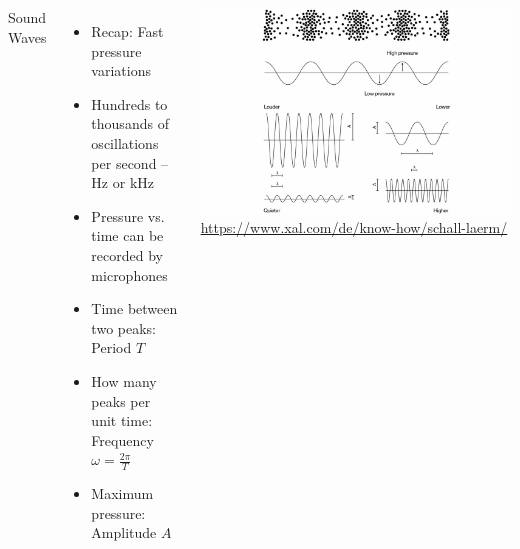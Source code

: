 \begin{frame}
%
\begin{columns}[T]
\begin{Large}
	{Sound Waves}
	\vspace{6pt}
\end{Large}
%
\begin{itemize}
\item Recap: Fast pressure variations 
\item Hundreds to thousands of oscillations per second -- Hz or kHz
\item Pressure vs. time can be recorded by microphones
\item Time between two peaks: Period $T$
\item How many peaks per unit time: Frequency $\omega = \frac{2\pi}{T}$
\item Maximum pressure: Amplitude $A$
\end{itemize}
%
\begin{center}
	\includegraphics[width=\linewidth]{./gfx/soundwaves}
	\scriptsize
	\url{https://www.xal.com/de/know-how/schall-laerm/}
\end{center}
\end{columns}
%
\end{frame}


